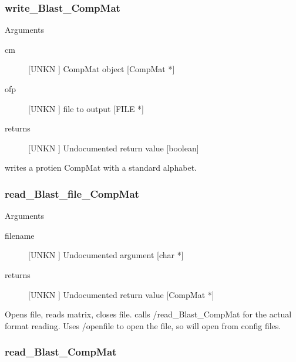 \subsubsection{write_Blast_CompMat}

Arguments
\begin{description}
\item[cm] [UNKN ] CompMat object [CompMat *]
\item[ofp] [UNKN ] file to output [FILE *]
\item[returns] [UNKN ] Undocumented return value [boolean]
\end{description}
writes a protien CompMat with a standard
alphabet.


\subsubsection{read_Blast_file_CompMat}

Arguments
\begin{description}
\item[filename] [UNKN ] Undocumented argument [char *]
\item[returns] [UNKN ] Undocumented return value [CompMat *]
\end{description}
Opens file, reads matrix, closes file.
calls /read_Blast_CompMat for the actual format
reading. Uses /openfile to open the file,
so will open from config files.


\subsubsection{read_Blast_CompMat}

